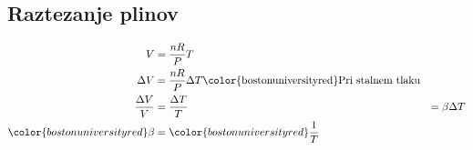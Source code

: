 {\color{indiagreen}\subsection{Raztezanje plinov}}
\begin{align*}
	V &= \frac{nR}{P}T\\
	\Delta V &= \frac{nR}{P}\Delta T \text{{\color{bostonuniversityred}Pri stalnem tlaku}}\\
	\frac{\Delta V}{V} &= \frac{\Delta T}{T} &= \beta \Delta T\\
	{\color{bostonuniversityred}\beta} &= {\color{bostonuniversityred}\frac{1}{T}}\\
\end{align*}